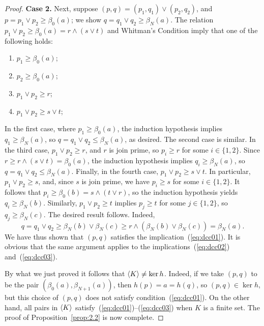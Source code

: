 \begin{proof}
    \medskip
    \noindent \textbf{Case 2.}
    Next, 
    suppose $(p,q) = (p_1, q_1) \vee (p_2, q_2)$, and
    $p = p_1\vee p_2 \geq \beta_0(a)$; we show 
    $q = q_1 \vee q_2 \geq \beta_N(a)$. 
    The relation $p_1\vee p_2 \geq \beta_0(a) = r \wedge (s \vee t)$ and
    Whitman's Condition imply that one of the following holds:
    \begin{enumerate}
      \item   $p_1\geq \beta_0(a)$;  
      \item   $p_2\geq \beta_0(a)$;  
      \item   $p_1\vee p_2 \geq r$;  
      \item   $p_1\vee p_2 \geq s \vee t$;  
    \end{enumerate}
    In the first case, where $p_1 \geq \beta_0(a)$, 
    the induction hypothesis implies $q_1\geq \beta_N(a)$, so 
    $q = q_1\vee q_2\leq \beta_N(a)$, as desired.  
    The second case is similar.
    In the third case, $p_1 \vee p_2 \geq r$, and $r$ is join prime, so 
    $p_i \geq r$ for some $i\in \{1,2\}$.  Since $r\geq r \wedge (s\vee t) = \beta_0(a)$, 
    the induction hypothesis implies $q_i \geq \beta_N(a)$, 
    so $q = q_1\vee q_2\leq \beta_N(a)$.
    Finally, in the fourth case, $p_1\vee p_2 \geq s \vee t$. 
    In particular, $p_1\vee p_2 \geq s$, and, since $s$ is join prime,
    we have $p_i\geq s$ for some $i\in \{1,2\}$.  
    It follows that $p_i \geq \beta_0(b) = s\wedge (t\vee r)$, so the induction hypothesis
    yields $q_i \geq \beta_N(b)$.
    Similarly, $p_1\vee p_2 \geq t$ implies 
    $p_j\geq t$ for some $j\in \{1,2\}$, so $q_j \geq \beta_N(c)$.
    The desired result follows.  Indeed,
    \[
    q = q_1\vee q_2 \geq \beta_N(b) \vee \beta_N(c) 
    \geq r \wedge (\beta_N(b)\vee \beta_N(c)) = \beta_N(a).
    \]                   
    We have thus shown that $(p,q)$ satisfies the implication~(\ref{eq:dcc01}).
    It is obvious that the same argument applies to the 
    implications~(\ref{eq:dcc02}) and~(\ref{eq:dcc03}).
  
    \medskip
  By what we just proved it follows that 
  $\langle K\rangle \neq \ker h$. Indeed, if we take $(p, q)$ to be 
  the pair $(\beta_0(a), \beta_{N+1}(a))$, then  $h(p) = a = h(q)$, 
  so $(p,q) \in \ker h$, but this choice of $(p,q)$ does not satisfy 
  condition~(\ref{eq:dcc01}). On 
  the other hand, all pairs in $\langle K\rangle$ 
  satisfy~(\ref{eq:dcc01})--(\ref{eq:dcc03}) when $K$ is a finite set.   The 
  proof of Proposition~\ref{prop:2.2} is now complete.
\end{proof}

